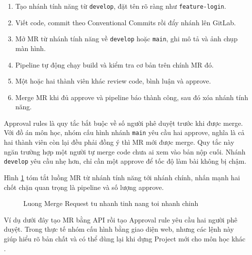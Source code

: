 \begin{enumerate}
\item Tạo nhánh tính năng từ \texttt{develop}, đặt tên rõ ràng như \texttt{feature-login}.
\item Viết code, commit theo Conventional Commits rồi đẩy nhánh lên GitLab.
\item Mở MR từ nhánh tính năng về \texttt{develop} hoặc \texttt{main}, ghi mô tả và ảnh chụp màn hình.
\item Pipeline tự động chạy build và kiểm tra cơ bản trên chính MR đó.
\item Một hoặc hai thành viên khác review code, bình luận và approve.
\item Merge MR khi đủ approve và pipeline báo thành công, sau đó xóa nhánh tính năng.
\end{enumerate}

Approval rules là quy tắc bắt buộc về số người phê duyệt trước khi được merge.
Với đồ án môn học, nhóm cấu hình nhánh \texttt{main} yêu cầu hai approve,
nghĩa là cả hai thành viên còn lại đều phải đồng ý thì MR mới được merge.
Quy tắc này ngăn trường hợp một người tự merge code chưa ai xem vào bản nộp cuối.
Nhánh \texttt{develop} yêu cầu nhẹ hơn, chỉ cần một approve để tốc độ làm bài không bị chậm.

Hình \ref{fig:c51-mr-flow} tóm tắt luồng MR từ nhánh tính năng tới nhánh chính,
nhấn mạnh hai chốt chặn quan trọng là pipeline và số lượng approve.

\begin{figure}[H]
\centering
{}
\caption{Luong Merge Request tu nhanh tinh nang toi nhanh chinh}
\label{fig:c51-mr-flow}
\end{figure}

Ví dụ dưới đây tạo MR bằng API rồi tạo Approval rule yêu cầu hai người phê duyệt.
Trong thực tế nhóm cấu hình bằng giao diện web, nhưng các lệnh này giúp hiểu rõ bản chất
và có thể dùng lại khi dựng Project mới cho môn học khác \cite{gitlabdocs}.

